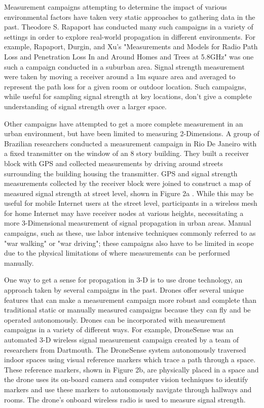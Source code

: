 \documentclass[pageno]{jpaper}
\begin{document}
Measurement campaigns attempting to determine the impact of various environmental factors have taken very static approaches to gathering data in the past. Theodore S. Rapaport has conducted many such campaigns in a variety of settings in order to explore real-world propagation in different environments. For example, Rapaport, Durgin, and Xu's "Measurements and Models for Radio Path Loss and Penetration Loss In and Around Homes and Trees at 5.8GHz" was one such a campaign conducted in a suburban area. Signal strength measurement were taken by moving a receiver around a 1m square area and averaged to represent the path loss for a given room or outdoor location\cite{rapaport}. Such campaigns, while useful for sampling signal strength at key locations, don't give a complete understanding of signal strength over a larger space. 

Other campaigns have attempted to get a more complete measurement in an urban environment, but have been limited to measuring 2-Dimensions. A group of Brazilian researchers conducted a measurement campaign in Rio De Janeiro with a fixed transmitter on the window of an 8 story building\cite{urban}. They built a receiver block with GPS and collected measurements by driving around streets surrounding the building housing the transmitter. GPS and signal strength measurements collected by the receiver block were joined to construct a map of measured signal strength at street level, shown in Figure 2a . While this may be useful for mobile Internet users at the street level, participants in a wireless mesh for home Internet may have receiver nodes at various heights, necessitating a more 3-Dimensional measurement of signal propagation in urban areas. Manual campaigns, such as these, use labor intensive techniques commonly referred to as "war walking" or "war driving"\cite{urban}; these campaigns also have to be limited in scope due to the physical limitations of where measurements can be performed manually. 

One way to get a sense for propagation in 3-D is to use drone technology, an approach taken by several campaigns in the past. Drones offer several unique features that can make a measurement campaign more robust and complete than traditional static or manually measured campaigns because they can fly and be operated autonomously. Drones can be incorporated with measurement campaigns in a variety of different ways. For example, DroneSense\cite{dronesense} was an automated 3-D wireless signal measurement campaign created by a team of researchers from Dartmouth. The DroneSense system autonomously traversed indoor spaces using visual reference markers which trace a path through a space. These reference markers, shown in Figure 2b, are physically placed in a space and the drone uses its on-board camera and computer vision techniques to identify markers and use these markers to autonomously navigate through hallways and rooms. The drone's onboard wireless radio is used to measure signal strength.
\end{document}

